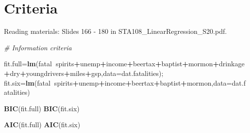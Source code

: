 \documentclass[12pt,]{book}
\newenvironment{Shaded}{\begin{snugshade}}{\end{snugshade}}
\newcommand{\KeywordTok}[1]{\textcolor[rgb]{0.13,0.29,0.53}{\textbf{#1}}}
\newcommand{\DataTypeTok}[1]{\textcolor[rgb]{0.13,0.29,0.53}{#1}}
\newcommand{\CommentTok}[1]{\textcolor[rgb]{0.56,0.35,0.01}{\textit{#1}}}
\newcommand{\OperatorTok}[1]{\textcolor[rgb]{0.81,0.36,0.00}{\textbf{#1}}}
\newcommand{\NormalTok}[1]{#1}
\begin{document}
\section{Criteria}\label{criteria}

Reading materials: Slides 166 - 180 in
STA108\_LinearRegression\_S20.pdf.

\begin{Shaded}
\begin{Highlighting}[]
\CommentTok{# Information criteria}


\NormalTok{fit.full=}\KeywordTok{lm}\NormalTok{(fatal}\OperatorTok{~}\NormalTok{spirits}\OperatorTok{+}\NormalTok{unemp}\OperatorTok{+}\NormalTok{income}\OperatorTok{+}\NormalTok{beertax}\OperatorTok{+}\NormalTok{baptist}\OperatorTok{+}\NormalTok{mormon}\OperatorTok{+}\NormalTok{drinkage}\OperatorTok{+}\NormalTok{dry}\OperatorTok{+}\NormalTok{youngdrivers}\OperatorTok{+}\NormalTok{miles}\OperatorTok{+}\NormalTok{gsp,}\DataTypeTok{data=}\NormalTok{dat.fatalities);}
\NormalTok{fit.six=}\KeywordTok{lm}\NormalTok{(fatal}\OperatorTok{~}\NormalTok{spirits}\OperatorTok{+}\NormalTok{unemp}\OperatorTok{+}\NormalTok{income}\OperatorTok{+}\NormalTok{beertax}\OperatorTok{+}\NormalTok{baptist}\OperatorTok{+}\NormalTok{mormon,}\DataTypeTok{data=}\NormalTok{dat.fatalities)}

\KeywordTok{BIC}\NormalTok{(fit.full)}
\KeywordTok{BIC}\NormalTok{(fit.six)}


\KeywordTok{AIC}\NormalTok{(fit.full)}
\KeywordTok{AIC}\NormalTok{(fit.six) }
\end{Highlighting}
\end{Shaded}
\end{document}
